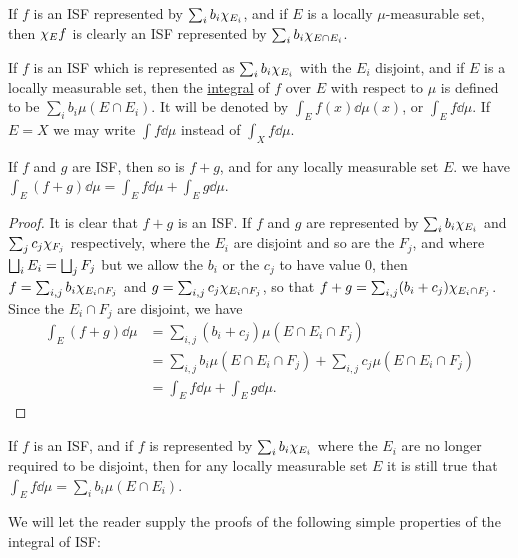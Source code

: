 If $f$ is an ISF represented by $\sum_ib_i\chi_{E_i}$, and if $E$ is a locally $\mu$-measurable set, then $\chi_{E}f$ is clearly an ISF represented by $\sum_ib_i\chi_{E\cap E_i}$.

\begin{definition}
If $f$ is an ISF which is represented as $\sum_i b_i\chi_{E_i}$ with the $E_i$ disjoint, and if $E$ is a locally measurable set, then the \underline{integral} of $f$ over $E$ with respect to $\mu$ is defined to be $\sum_ib_i \mu(E \cap E_i)$. It will be denoted by $\int_Ef(x)\dd\mu(x)$, or $\int_Ef\dd\mu$. If $E=X$ we may write $\int f\dd\mu$ instead of $\int_Xf\dd\mu$.
\end{definition}

\begin{lemma}
If $f$ and $g$ are ISF, then so is $f+g$, and for any locally measurable set $E$. we have $\int_E(f+g)\dd\mu=\int_Ef\dd\mu+\int_Eg\dd\mu$.
\end{lemma}

\begin{proof}
It is clear that $f+g$ is an ISF. If $f$ and $g$ are represented by $\sum_ib_i\chi_{E_i}$ and $\sum_jc_j\chi_{F_j}$ respectively, where the $E_i$ are disjoint and so are the $F_j$, and where $\bigsqcup_iE_i=\bigsqcup_jF_j$ but we allow the $b_i$ or the $c_j$ to have value 0, then $f=\sum_{i, j}b_i\chi_{E_i\cap F_j}$ and $g=\sum_{i, j}c_j \chi_{E_i\cap F_j}$, so that $f+g=\sum_{i, j}(b_i+c_j)\chi_{E_i\cap F_j}$. Since the $E_i \cap F_j$ are disjoint, we have
\begin{align*}
    \int_E(f+g)\dd\mu&=\sum_{i,j}(b_i+c_j)\mu(E\cap E_i\cap F_j)\\
    &=\sum_{i,j}b_i\mu(E \cap E_i \cap F_j)+\sum_{i,j}c_j\mu(E\cap E_i\cap F_j)\\
    &=\int_Ef\dd\mu+\int_Eg\dd\mu.
\end{align*}
\end{proof}

\begin{corollary}
If $f$ is an ISF, and if $f$ is represented by $\sum_ib_i\chi_{E_i}$ where the $E_i$ are no longer required to be disjoint, then for any locally measurable set $E$ it is still true that $\int_Ef\dd\mu=\sum_ib_i\mu(E\cap E_i)$.
\end{corollary}

We will let the reader supply the proofs of the following simple properties of the integral of ISF:

